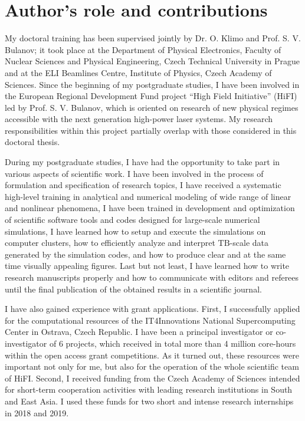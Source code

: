 \documentclass[10pt, a4paper, twoside, openright]{report}
\newcommand{\q}[1]{``#1''} %
\begin{document}
\section{Author's role and contributions}
%

My doctoral training has been supervised jointly by Dr. O. Klimo and Prof. S. V. Bulanov; it took place at the Department of Physical Electronics, Faculty of Nuclear Sciences and Physical Engineering, Czech Technical University in Prague and at the ELI Beamlines Centre, Institute of Physics, Czech Academy of Sciences. Since the beginning of my postgraduate studies, I have been involved in the European Regional Development Fund project \q{High Field Initiative} (HiFI) led by Prof. S. V. Bulanov, which is oriented on research of new physical regimes accessible with the next generation high-power laser systems. My research responsibilities within this project partially overlap with those considered in this doctoral thesis.

During my postgraduate studies, I have had the opportunity to take part in various aspects of scientific work. I have been involved in the process of formulation and specification of research topics, I have received a systematic high-level training in analytical and numerical modeling of wide range of linear and nonlinear phenomena, I have been trained in development and optimization of scientific software tools and codes designed for large-scale numerical simulations, I have learned how to setup and execute the simulations on computer clusters, how to efficiently analyze and interpret $ \mathrm{TB} $-scale data generated by the simulation codes, and how to produce clear and at the same time visually appealing figures. Last but not least, I have learned how to write research manuscripts properly and how to communicate with editors and referees until the final publication of the obtained results in a scientific journal.

I have also gained experience with grant applications. First, I successfully applied for the computational resources of the IT4Innovations National Supercomputing Center in Ostrava, Czech Republic. I have been a principal investigator or co-investigator of 6 projects, which received in total more than 4 million core-hours within the open access grant competitions. As it turned out, these resources were important not only for me, but also for the operation of the whole scientific team of HiFI. Second, I received funding from the Czech Academy of Sciences intended for short-term cooperation activities with leading research institutions in South and East Asia. I used these funds for two short and intense research internships in 2018 and 2019. 
\end{document}
